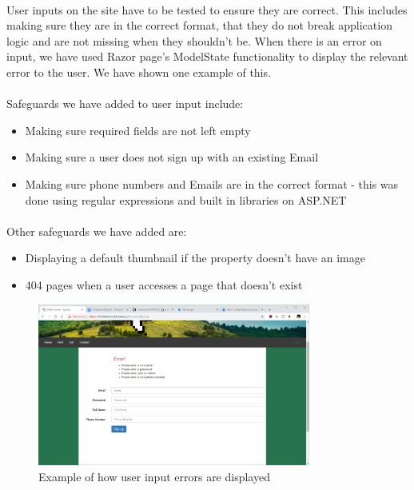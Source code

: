 \documentclass{article}
\begin{document}
        \paragraph{}
            User inputs on the site have to be tested to ensure they are correct. This includes making sure they are in the correct format, that they do not break application logic and are not missing when they shouldn't be. When there is an error on input, we have used Razor page’s ModelState functionality to display the relevant error to the user. We have shown one example of this.

        \paragraph{}
            Safeguards we have added to user input include:
            \begin{itemize}\itemsep 0pt
                \item Making sure required fields are not left empty
                \item Making sure a user does not sign up with an existing Email
                \item Making sure phone numbers and Emails are in the correct format - this was done using regular expressions and built in libraries on ASP.NET
            \end{itemize}

        \paragraph{}
            Other safeguards we have added are:
            \begin{itemize}\itemsep 0pt
                \item Displaying a default thumbnail if the property doesn't have an image
                \item 404 pages when a user accesses a page that doesn't exist
            \end{itemize}

            \begin{figure}[!htb]
                \centering
                \includegraphics[width=0.8\textwidth]{figures/logic_error.png}
                \caption[Logic Error]{Example of how user input errors are displayed}
            \end{figure}
\end{document}
